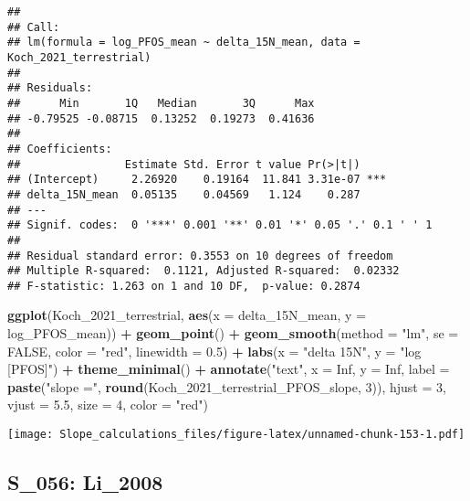 \documentclass[
]{article}
\newenvironment{Shaded}{\begin{snugshade}}{\end{snugshade}}
\newcommand{\AttributeTok}[1]{\textcolor[rgb]{0.13,0.29,0.53}{#1}}
\newcommand{\ConstantTok}[1]{\textcolor[rgb]{0.56,0.35,0.01}{#1}}
\newcommand{\DecValTok}[1]{\textcolor[rgb]{0.00,0.00,0.81}{#1}}
\newcommand{\FloatTok}[1]{\textcolor[rgb]{0.00,0.00,0.81}{#1}}
\newcommand{\FunctionTok}[1]{\textcolor[rgb]{0.13,0.29,0.53}{\textbf{#1}}}
\newcommand{\NormalTok}[1]{#1}
\newcommand{\SpecialCharTok}[1]{\textcolor[rgb]{0.81,0.36,0.00}{\textbf{#1}}}
\newcommand{\StringTok}[1]{\textcolor[rgb]{0.31,0.60,0.02}{#1}}
\begin{document}
\begin{verbatim}
## 
## Call:
## lm(formula = log_PFOS_mean ~ delta_15N_mean, data = Koch_2021_terrestrial)
## 
## Residuals:
##      Min       1Q   Median       3Q      Max 
## -0.79525 -0.08715  0.13252  0.19273  0.41636 
## 
## Coefficients:
##                Estimate Std. Error t value Pr(>|t|)    
## (Intercept)     2.26920    0.19164  11.841 3.31e-07 ***
## delta_15N_mean  0.05135    0.04569   1.124    0.287    
## ---
## Signif. codes:  0 '***' 0.001 '**' 0.01 '*' 0.05 '.' 0.1 ' ' 1
## 
## Residual standard error: 0.3553 on 10 degrees of freedom
## Multiple R-squared:  0.1121, Adjusted R-squared:  0.02332 
## F-statistic: 1.263 on 1 and 10 DF,  p-value: 0.2874
\end{verbatim}

\begin{Shaded}
\begin{Highlighting}[]
\FunctionTok{ggplot}\NormalTok{(Koch\_2021\_terrestrial, }\FunctionTok{aes}\NormalTok{(}\AttributeTok{x =}\NormalTok{ delta\_15N\_mean, }\AttributeTok{y =}\NormalTok{ log\_PFOS\_mean)) }\SpecialCharTok{+}
  \FunctionTok{geom\_point}\NormalTok{() }\SpecialCharTok{+}
  \FunctionTok{geom\_smooth}\NormalTok{(}\AttributeTok{method =} \StringTok{"lm"}\NormalTok{, }\AttributeTok{se =} \ConstantTok{FALSE}\NormalTok{, }\AttributeTok{color =} \StringTok{"red"}\NormalTok{, }\AttributeTok{linewidth =} \FloatTok{0.5}\NormalTok{) }\SpecialCharTok{+}
  \FunctionTok{labs}\NormalTok{(}\AttributeTok{x =} \StringTok{"delta 15N"}\NormalTok{,}
       \AttributeTok{y =} \StringTok{"log [PFOS]"}\NormalTok{) }\SpecialCharTok{+}
  \FunctionTok{theme\_minimal}\NormalTok{() }\SpecialCharTok{+}
  \FunctionTok{annotate}\NormalTok{(}\StringTok{"text"}\NormalTok{, }\AttributeTok{x =} \ConstantTok{Inf}\NormalTok{, }\AttributeTok{y =} \ConstantTok{Inf}\NormalTok{, }\AttributeTok{label =} \FunctionTok{paste}\NormalTok{(}\StringTok{"slope ="}\NormalTok{, }\FunctionTok{round}\NormalTok{(Koch\_2021\_terrestrial\_PFOS\_slope, }\DecValTok{3}\NormalTok{)), }
           \AttributeTok{hjust =} \DecValTok{3}\NormalTok{, }\AttributeTok{vjust =} \FloatTok{5.5}\NormalTok{, }\AttributeTok{size =} \DecValTok{4}\NormalTok{, }\AttributeTok{color =} \StringTok{"red"}\NormalTok{)}
\end{Highlighting}
\end{Shaded}

\texttt{[image: Slope\_calculations\_files/figure-latex/unnamed-chunk-153-1.pdf]}

\subsection{S\_056: Li\_2008}\label{s_056-li_2008-1}
\end{document}
